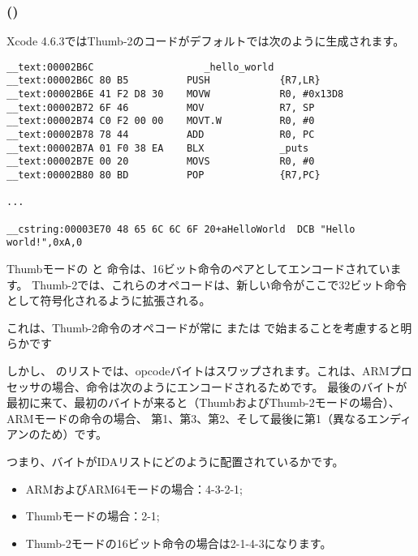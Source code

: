 \subsubsection{\OptimizingXcodeIV (\ThumbTwoMode)}

Xcode 4.6.3ではThumb-2のコードがデフォルトでは次のように生成されます。

\begin{lstlisting}[caption=\OptimizingXcodeIV (\ThumbTwoMode),style=customasmARM]
__text:00002B6C                   _hello_world
__text:00002B6C 80 B5          PUSH            {R7,LR}
__text:00002B6E 41 F2 D8 30    MOVW            R0, #0x13D8
__text:00002B72 6F 46          MOV             R7, SP
__text:00002B74 C0 F2 00 00    MOVT.W          R0, #0
__text:00002B78 78 44          ADD             R0, PC
__text:00002B7A 01 F0 38 EA    BLX             _puts
__text:00002B7E 00 20          MOVS            R0, #0
__text:00002B80 80 BD          POP             {R7,PC}

...

__cstring:00003E70 48 65 6C 6C 6F 20+aHelloWorld  DCB "Hello world!",0xA,0
\end{lstlisting}


\myindex{\ThumbTwoMode}

Thumbモードの と 命令は、16ビット命令のペアとしてエンコードされています。 
Thumb-2では、これらのオペコードは、新しい命令がここで32ビット命令として符号化されるように拡張される。

これは、Thumb-2命令のオペコードが常に または で始まることを考慮すると明らかです

しかし、 \IDA のリストでは、opcodeバイトはスワップされます。これは、ARMプロセッサの場合、命令は次のようにエンコードされるためです。
最後のバイトが最初に来て、最初のバイトが来ると（ThumbおよびThumb-2モードの場合）、
ARMモードの命令の場合、 第1、第3、第2、そして最後に第1（異なるエンディアンのため）です。

つまり、バイトがIDAリストにどのように配置されているかです。

\begin{itemize}
\item ARMおよびARM64モードの場合：4-3-2-1;
\item Thumbモードの場合：2-1;
\item Thumb-2モードの16ビット命令の場合は2-1-4-3になります。
\end{itemize}

